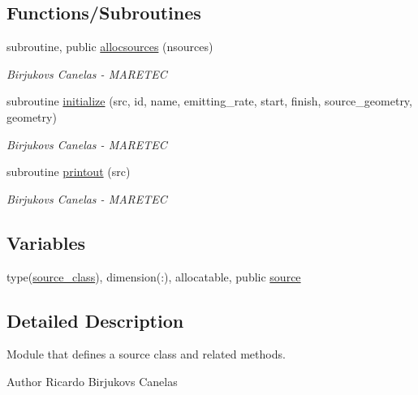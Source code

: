 \subsection*{Functions/\+Subroutines}
\begin{DoxyCompactItemize}
\item 
subroutine, public \mbox{\hyperlink{namespacesource__identity_a716b4cb4acec5756a6d4dcf20eee588e}{allocsources}} (nsources)
\begin{DoxyCompactList}\small\item\em Birjukovs Canelas -\/ M\+A\+R\+E\+T\+EC \end{DoxyCompactList}\item 
subroutine \mbox{\hyperlink{namespacesource__identity_a8d7aaa58c575f6ed78f5ca29d64615d7}{initialize}} (src, id, name, emitting\+\_\+rate, start, finish, source\+\_\+geometry, geometry)
\begin{DoxyCompactList}\small\item\em Birjukovs Canelas -\/ M\+A\+R\+E\+T\+EC \end{DoxyCompactList}\item 
subroutine \mbox{\hyperlink{namespacesource__identity_a9715a7d707b4c80aa2d2ebd08712f6a9}{printout}} (src)
\begin{DoxyCompactList}\small\item\em Birjukovs Canelas -\/ M\+A\+R\+E\+T\+EC \end{DoxyCompactList}\end{DoxyCompactItemize}
\subsection*{Variables}
\begin{DoxyCompactItemize}
\item 
type(\mbox{\hyperlink{structsource__identity_1_1source__class}{source\+\_\+class}}), dimension(\+:), allocatable, public \mbox{\hyperlink{namespacesource__identity_a5ed8006613af7461c6a2ff1cdaeb8f0f}{source}}
\end{DoxyCompactItemize}


\subsection{Detailed Description}
Module that defines a source class and related methods. 

\begin{DoxyAuthor}{Author}
Ricardo Birjukovs Canelas 
\end{DoxyAuthor}


